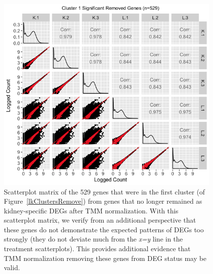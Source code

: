 \documentclass{article}
\begin{document}
\null
\begin{figure}[t!]
\centerline{\includegraphics[width=1\columnwidth]{../MakeFigures/lkClustersRemoveSM.jpg}}
\caption{Scatterplot matrix of the 529 genes that were in the first cluster (of Figure~\ref{lkClustersRemove}) from genes that no longer remained as kidney-specific DEGs after TMM normalization. With this scatterplot matrix, we verify from an additional perspective that these genes do not demonstrate the expected patterns of DEGs too strongly (they do not deviate much from the \textit{x=y} line in the treatment scatterplots). This provides additional evidence that TMM normalization removing these genes from DEG status may be valid.
\label{lkClustersRemoveSM}}
\end{figure}
\end{document}
